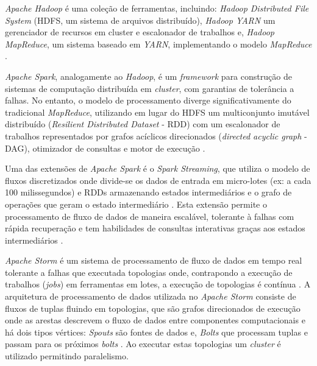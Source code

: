\emph{Apache Hadoop} é uma coleção de ferramentas, incluindo: \emph{Hadoop
Distributed File System} (HDFS, um sistema de arquivos distribuído), \emph{Hadoop
YARN} um gerenciador de recursos em cluster e escalonador de trabalhos e,
\emph{Hadoop MapReduce}, um sistema baseado em \emph{YARN}, implementando o modelo
\emph{MapReduce} \cite{ApacheHadoop2020}.

\emph{Apache Spark}, analogamente ao \emph{Hadoop}, é um \emph{framework} para
construção de sistemas de computação distribuída em \emph{cluster}, com garantias
de tolerância a falhas.
No entanto, o modelo de processamento diverge
significativamente do tradicional \emph{MapReduce}, utilizando em lugar do HDFS
um multiconjunto imutável distribuído (\emph{Resilient Distributed Dataset}
- RDD) com um escalonador de trabalhos representados por grafos acíclicos
direcionados (\emph{directed acyclic graph} - DAG), otimizador de consultas e
motor de execução \cite{ApacheSpark2020}.

Uma das extensões de \emph{Apache Spark} é o \emph{Spark Streaming}, que utiliza
o modelo de fluxos discretizados onde divide-se os dados de entrada em
micro-lotes (ex: a cada 100 milissegundos) e RDDs armazenando estados
intermediários e o grafo de operações que geram o estado intermediário
\cite{sparkStreaming2016}.
% 
Esta extensão permite o processamento de fluxo de dados de maneira escalável,
tolerante à falhas com rápida recuperação e tem habilidades de consultas
interativas graças aos estados intermediários
\cite{sparkStreaming2016,Lopez2018}.


% 
\emph{Apache Storm} é um sistema de processamento de fluxo de dados em tempo
real tolerante a falhas que executada topologias onde, contrapondo a execução de
trabalhos (\emph{jobs}) em ferramentas em lotes, a execução de topologias é
contínua \cite{toshniwal2014storm,Lopez2018,ApacheStorm2020}.
% 
A arquitetura de processamento de dados utilizada no \emph{Apache Storm}
consiste de fluxos de tuplas fluindo em topologias, que são grafos direcionados
de execução onde as arestas descrevem o fluxo de dados entre componentes
computacionais e há dois tipos vértices:
\emph{Spouts} são fontes de dados e,
\emph{Bolts} que processam tuplas e passam para os próximos \emph{bolts}
\cite{toshniwal2014storm}.
Ao executar estas topologias um \emph{cluster} é utilizado permitindo paralelismo.

